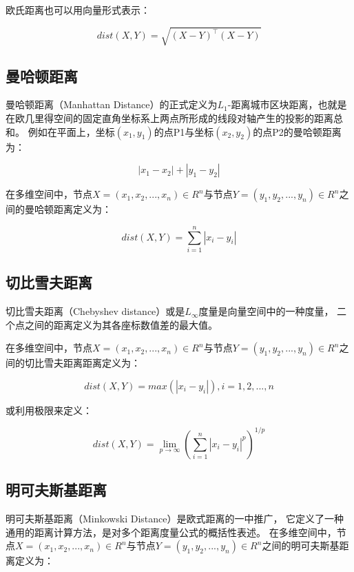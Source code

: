 欧氏距离也可以用向量形式表示：

\begin{equation}
    dist(X, Y) = \sqrt{(X - Y)^\top(X - Y)}
\end{equation}

\subsection{曼哈顿距离}

曼哈顿距离（Manhattan Distance）的正式定义为$L_1$-距离城市区块距离，也就是在欧几里得空间的固定直角坐标系上两点所形成的线段对轴产生的投影的距离总和。
例如在平面上，坐标$(x_1, y_1)$的点P1与坐标$(x_2, y_2)$的点P2的曼哈顿距离为：

$$
    |x_1 - x_2| + |y_1 - y_2|
$$

在多维空间中，节点$X = (x_1, x_2, ..., x_n) \in R ^ n$与节点$Y = (y_1, y_2, ..., y_n) \in R ^ n$之间的曼哈顿距离定义为：

\begin{equation}
    dist(X, Y) = \sum_{i=1}^{n} |x_i - y_i|
\end{equation}

\subsection{切比雪夫距离}

切比雪夫距离（Chebyshev distance）或是$L_\infty$度量是向量空间中的一种度量，
二个点之间的距离定义为其各座标数值差的最大值。

在多维空间中，节点$X = (x_1, x_2, ..., x_n) \in R ^ n$与节点$Y = (y_1, y_2, ..., y_n) \in R ^ n$之间的切比雪夫距离距离定义为：

\begin{equation}
    dist(X, Y) = max(|x_i - y_i|), i = 1, 2, ..., n
\end{equation}

或利用极限来定义：

\begin{equation}
    dist(X, Y) = \lim_{p \rightarrow \infty}(\sum_{i=1}^{n} |x_i - y_i|^p)^{1/p}
\end{equation}

\subsection{明可夫斯基距离}

明可夫斯基距离（Minkowski Distance）是欧式距离的一中推广，
它定义了一种通用的距离计算方法，是对多个距离度量公式的概括性表述。
在多维空间中，节点$X = (x_1, x_2, ..., x_n) \in R ^ n$与节点$Y = (y_1, y_2, ..., y_n) \in R ^ n$之间的明可夫斯基距离定义为：

